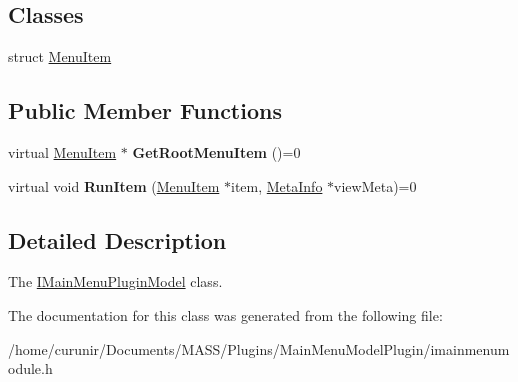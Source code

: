 \subsection*{Classes}
\begin{DoxyCompactItemize}
\item 
struct \hyperlink{struct_i_main_menu_plugin_model_1_1_menu_item}{Menu\+Item}
\end{DoxyCompactItemize}
\subsection*{Public Member Functions}
\begin{DoxyCompactItemize}
\item 
virtual \hyperlink{struct_i_main_menu_plugin_model_1_1_menu_item}{Menu\+Item} $\ast$ {\bfseries Get\+Root\+Menu\+Item} ()=0
\item 
virtual void {\bfseries Run\+Item} (\hyperlink{struct_i_main_menu_plugin_model_1_1_menu_item}{Menu\+Item} $\ast$item, \hyperlink{struct_meta_info}{Meta\+Info} $\ast$view\+Meta)=0
\end{DoxyCompactItemize}


\subsection{Detailed Description}
The \hyperlink{class_i_main_menu_plugin_model}{I\+Main\+Menu\+Plugin\+Model} class. 

The documentation for this class was generated from the following file\+:\begin{DoxyCompactItemize}
\item 
/home/curunir/\+Documents/\+M\+A\+S\+S/\+Plugins/\+Main\+Menu\+Model\+Plugin/imainmenumodule.\+h\end{DoxyCompactItemize}
